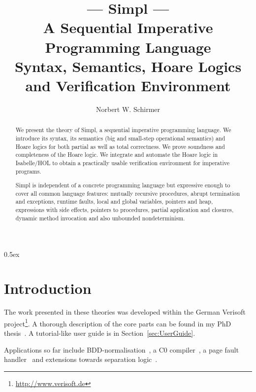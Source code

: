 \documentclass[11pt,a4paper]{article}
\begin{document}
\title{--- \textbf{Simpl} --- \\
       A Sequential Imperative Programming Language\\
       Syntax, Semantics, Hoare Logics and Verification Environment}
\author{Norbert W. Schirmer}

\begin{abstract}
We present the theory of Simpl, a sequential imperative programming language.
We introduce its syntax, its semantics (big and small-step operational
semantics) and Hoare logics for both partial as well as total correctness.
We prove soundness and completeness of the Hoare logic. We
integrate and automate the Hoare logic in Isabelle/HOL to obtain a
practically usable verification environment for imperative programs.

Simpl is independent of a concrete programming language but expressive
enough to cover all common language features: mutually recursive
procedures, abrupt termination and exceptions, runtime faults, local
and global variables, pointers and heap, expressions with side
effects, pointers to procedures, partial application and closures,
dynamic method invocation and also unbounded nondeterminism.
\end{abstract}

\maketitle

\tableofcontents
\parindent 0pt\parskip 0.5ex

\pagebreak

\begin{center}
  \end{center}

\pagebreak

\section{Introduction}

The work presented in these theories was developed within the German Verisoft
project\footnote{\url{http://www.verisoft.de}}. A thorough description of the core
parts can be found in my PhD thesis~\cite{Schirmer-PhD}. A tutorial-like user guide
is in Section~\ref{sec:UserGuide}.

Applications so far include BDD-normalisation~\cite{Ortner-Schirmer-TPHOL05},
a C0 compiler~\cite{Leinenbach:SSV08-??}, a page fault handler~\cite{Alkassar:TACAS08-??}
and extensions towards separation logic~\cite{Tuch:separation-logic:2007}.






\end{document}
